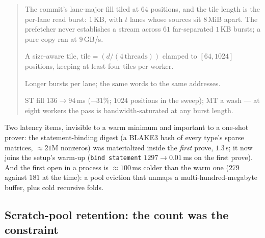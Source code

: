 \documentclass[11pt]{article}
\newcommand{\code}[1]{\texttt{#1}}
\newenvironment{optsummary}{%
  \begin{quote}\small
  \begin{description}
  \setlength{\itemsep}{1pt}\setlength{\parsep}{0pt}\setlength{\topsep}{2pt}
}{%
  \end{description}
  \end{quote}
}
\begin{document}
\begin{optsummary}
\item[Baseline:] The commit's lane-major fill tiled at $64$ positions, and the tile length is the per-lane read burst: $1\,$KB, with $t$ lanes whose sources sit $8\,$MiB apart. The prefetcher never establishes a stream across $61$ far-separated $1\,$KB bursts; a pure copy ran at $9\,$GB/s.
\item[Improvement:] A size-aware tile, $\mathrm{tile} = (d/(4\,\mathrm{threads}))$ clamped to $[64, 1024]$ positions, keeping at least four tiles per worker.
\item[Mechanism:] Longer bursts per lane; the same words to the same addresses.
\item[Result:] ST fill $136\to94\,$ms ($-31\%$; $1024$ positions in the sweep); MT a wash --- at eight workers the pass is bandwidth-saturated at any burst length.
\end{optsummary}

Two latency items, invisible to a warm minimum and important to a
one-shot prover: the statement-binding digest (a BLAKE3 hash of every
type's sparse matrices, $\approx21$M nonzeros) was materialized inside
the \emph{first} prove, $1.3\,$s; it now joins the setup's warm-up
(\code{bind statement} $1297\to0.01\,$ms on the first prove). And the
first open in a process is $\approx100\,$ms colder than the warm one
($279$ against $181$ at the time): a pool eviction that unmaps a
multi-hundred-megabyte buffer, plus cold recursive folds.

\subsection{Scratch-pool retention: the count was the constraint}\label{sec:poolcap}
\end{document}
